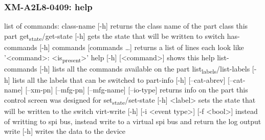 \documentclass[11pt]{article}
\begin{document}
\subsubsection{XM-A2L8-0409: help}
\label{sec:orge620e84}
list of commands:
  class-name [-h]
    returns the class name of the part class this part
  get\textsubscript{state}/get-state [-h]
    gets the state that will be written to switch
  has-commands [-h] commands [commands \ldots{}]
    returns a list of lines each look like '<command>: <is\textsubscript{present}>'
  help [-h] [<command>]
    shows this help
  list-commands [-h]
    lists all the commands available on the part
  list\textsubscript{labels}/list-labels [-h]
    lists all the labels that can be switched to
  part-info  [-h] [--cat-abrev] [--cat-name] [--xm-pn] [--mfg-pn] [--mfg-name]
          [--io-type]
    returns info on the part this control screen was designed for
  set\textsubscript{state}/set-state [-h] <label>
    sets the state that will be written to the switch
  virt-write [-h] [-i <event type>] [-f <bool>]
    instead of writting to spi bus, instead write to a virtual spi bus
    and return the log output
  write [-h]
    writes the data to the device
\end{document}
